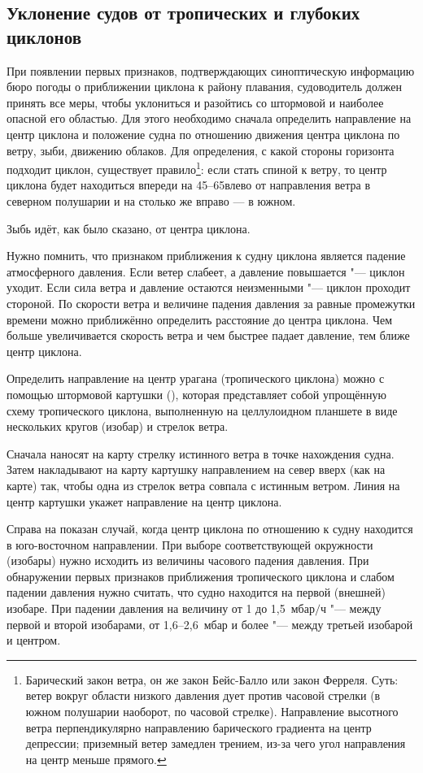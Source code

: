 \subsection{Уклонение судов от тропических и глубоких циклонов}
\label{sec:evasion_from_cyclones}

При появлении первых признаков, подтверждающих синоптическую
информацию бюро погоды о приближении циклона к району плавания,
судоводитель должен принять все меры, чтобы уклониться и разойтись со
штормовой и наиболее опасной его областью. Для этого необходимо
сначала определить направление на центр циклона и положение судна по
отношению движения центра циклона по ветру, зыби, движению
облаков. Для определения, с какой стороны горизонта подходит циклон,
существует правило\footnote{Барический закон ветра, он же закон
  Бейс-Балло или закон Ферреля. Суть: ветер вокруг области низкого
  давления дует против часовой стрелки (в южном полушарии наоборот, по
  часовой стрелке). Направление высотного ветра перпендикулярно
  направлению барического градиента на центр депрессии; приземный
  ветер замедлен трением, из-за чего угол направления на центр меньше
  прямого.}: если стать спиной к ветру, то центр циклона будет
находиться впереди на 45--65\gr влево от направления ветра в северном
полушарии и на столько же вправо — в южном.

Зыбь идёт, как было сказано, от центра циклона.

Нужно помнить, что признаком приближения к судну циклона является
падение атмосферного давления. Если ветер слабеет, а давление
повышается "--- циклон уходит. Если сила ветра и давление остаются
неизменными "--- циклон проходит стороной. По скорости ветра и величине
падения давления за равные промежутки времени можно приближённо
определить расстояние до центра циклона. Чем больше увеличивается
скорость ветра и чем быстрее падает давление, тем ближе центр циклона.

Определить направление на центр урагана (тропического циклона) можно с
помощью штормовой картушки (), которая представляет собой
упрощённую схему тропического циклона, выполненную на целлулоидном
планшете в виде нескольких кругов (изобар) и стрелок ветра.

Сначала наносят на карту стрелку истинного ветра в точке нахождения
судна. Затем накладывают на карту картушку направлением на север вверх
(как на карте) так, чтобы одна из стрелок ветра совпала с истинным
ветром. Линия на центр картушки укажет направление на центр циклона.

Справа на  показан случай, когда центр циклона по отношению
к судну находится в юго-восточном направлении. При выборе
соответствующей окружности (изобары) нужно исходить из величины
часового падения давления. При обнаружении первых признаков
приближения тропического циклона и слабом падении давления нужно
считать, что судно находится на первой (внешней) изобаре. При падении
давления на величину от 1 до 1,5~мбар$/$ч "--- между первой и второй
изобарами, от 1,6--2,6~мбар и более "--- между третьей изобарой и
центром.

